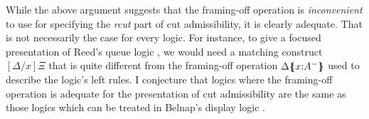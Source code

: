 While the above argument suggests that the framing-off operation 
is {\it inconvenient} to use for specifying the {\it rcut} part
of cut admissibility, it is clearly adequate. That is not necessarily
the case for every logic. For instance, to give a focused presentation
of Reed's queue logic \cite{reed09queue}, we would need a matching construct
$[\Delta/x]\Xi$ that is quite different from the framing-off operation
${\Delta}\mbox{$\{\hspace{-4pt}\{$}{x{:}A^-}\mbox{$\}\hspace{-4pt}\}$}$ used to describe the logic's left rules.
I conjecture that logics where the framing-off operation is adequate
for the presentation of cut admissibility are the same as those
logics which can be treated in Belnap's display logic \cite{belnap82display}.

